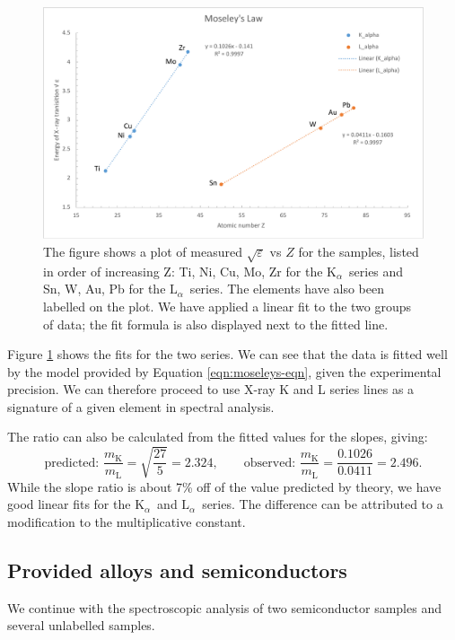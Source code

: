 \documentclass[11pt,a4paper,twoside,onecolumn]{article}
\newcommand{\Kalpha}{$\mathrm{K}_\alpha$~}
\newcommand{\Lalpha}{$\mathrm{L}_\alpha$~}
\begin{document}
\begin{figure}[!htbp]
    \centering
    \includegraphics[width=\textwidth]{img/moseleys.pdf}
    \caption{The figure shows a plot of measured $\sqrt{\varepsilon}$ vs $Z$ for the samples, listed in order of increasing Z: Ti, Ni, Cu, Mo, Zr for the \Kalpha series and Sn, W, Au, Pb for the \Lalpha series. The elements have also been labelled on the plot. We have applied a linear fit to the two groups of data; the fit formula is also displayed next to the fitted line.}\label{fig:moseleys}
\end{figure}

Figure \ref{fig:moseleys} shows the fits for the two series. We can see that the data is fitted well by the model provided by Equation \eqref{eqn:moseleys-eqn}, given the experimental precision. We can therefore proceed to use X-ray K and L series lines as a signature of a given element in spectral analysis.

The ratio can also be calculated from the fitted values for the slopes, giving:
\begin{equation}
    \text{predicted: }\frac{m_\mathrm{K}}{m_\mathrm{L}} = \sqrt{\frac{27}{5}} = 2.324,\qquad \text{observed: } \frac{m_\mathrm{K}}{m_\mathrm{L}} = \frac{0.1026}{0.0411} = 2.496.
\end{equation}
While the slope ratio is about 7\% off of the value predicted by theory, we have good linear fits for the \Kalpha and \Lalpha series. The difference can be attributed to a modification to the multiplicative constant.

\subsection{Provided alloys and semiconductors}\label{subsec:provided-alloys-semicond}
We continue with the spectroscopic analysis of two semiconductor samples and several unlabelled samples.
\end{document}
